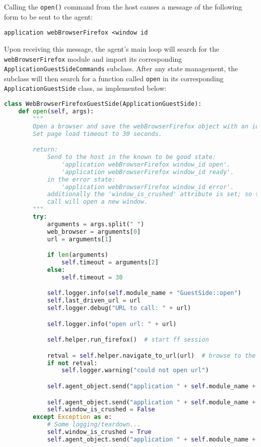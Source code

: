 \documentclass[letterpaper,12pt]{report}
\newcommand{\passthrough}[1]{#1}
\begin{document}
Calling the \passthrough{\lstinline!open()!} command from the host
causes a message of the following form to be sent to the agent:

\begin{lstlisting}
application webBrowserFirefox <window id
\end{lstlisting}

Upon receiving this message, the agent's main loop will search for the
\passthrough{\lstinline!webBrowserFirefox!} module and import its
corresponding \passthrough{\lstinline!ApplicationGuestSideCommands!}
subclass. After any state management, the subclass will then search for
a function called \passthrough{\lstinline!open!} in its corresponding
\passthrough{\lstinline!ApplicationGuestSide!} class, as implemented
below:

\begin{lstlisting}[language=Python]
class WebBrowserFirefoxGuestSide(ApplicationGuestSide):
    def open(self, args):
        """
        Open a browser and save the webBrowserFirefox object with an id in a dictionary.
        Set page load timeout to 30 seconds.

        return:
            Send to the host in the known to be good state:
                'application webBrowserFirefox window_id open'.
                'application webBrowserFirefox window_id ready'.
            in the error state:
                'application webBrowserFirefox window_id error'.
            additionally the 'window_is_crushed' attribute is set; so the next
            call will open a new window.
        """
        try:
            arguments = args.split(" ")
            web_browser = arguments[0]
            url = arguments[1]

            if len(arguments) 
                self.timeout = arguments[2]
            else:
                self.timeout = 30

            self.logger.info(self.module_name + "GuestSide::open")
            self.last_driven_url = url
            self.logger.debug("URL to call: " + url)

            self.logger.info("open url: " + url)

            self.helper.run_firefox()  # start ff session

            retval = self.helper.navigate_to_url(url)  # browse to the specified url
            if not retval:
                self.logger.warning("could not open url")

            self.agent_object.send("application " + self.module_name + " " + str(self.window_id) + " opened")

            self.agent_object.send("application " + self.module_name + " " + str(self.window_id) + " ready")
            self.window_is_crushed = False
        except Exception as e:
            # Some logging/teardown...
            self.window_is_crushed = True
            self.agent_object.send("application " + self.module_name + " " + str(self.window_id) + " error")
\end{lstlisting}
\end{document}
